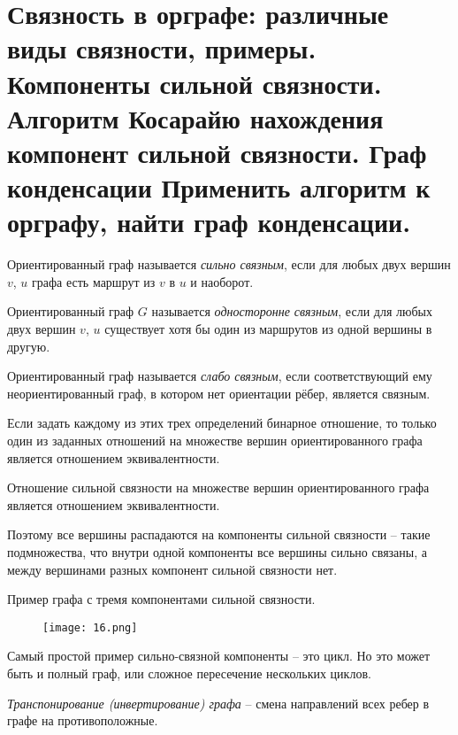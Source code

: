 \section{Связность в орграфе: различные виды связности, примеры. Компоненты сильной связности. 
Алгоритм Косарайю нахождения компонент сильной связности. Граф конденсации Применить 
алгоритм к орграфу, найти граф конденсации.}

\begin{definition}
    Ориентированный граф называется \textit{сильно связным}, если для
    любых двух вершин $v$, $u$ графа есть маршрут из $v$ в $u$ и наоборот.
\end{definition}

\begin{definition}
    Ориентированный граф $G$ называется \textit{односторонне связным},
    если для любых двух вершин $v$, $u$ существует хотя бы один из маршрутов из
    одной вершины в другую.
\end{definition}

\begin{definition}
    Ориентированный граф называется \textit{слабо связным}, если
    соответствующий ему неориентированный граф, в котором нет ориентации
    рёбер, является связным.
\end{definition}

Если задать каждому из этих трех определений бинарное отношение, то
только один из заданных отношений на множестве вершин ориентированного
графа является отношением эквивалентности.

\begin{theorem}
    Отношение сильной связности на множестве вершин ориентированного
    графа является отношением эквивалентности.
\end{theorem}

Поэтому все вершины распадаются на компоненты сильной связности --
такие подмножества, что внутри одной компоненты все вершины сильно
связаны, а между вершинами разных компонент сильной связности нет.

Пример графа с тремя компонентами сильной связности.
\begin{figure}[h]
    \centering
    \texttt{[image: 16.png]}
\end{figure}

Самый простой пример сильно-связной компоненты -- это цикл. Но это может
быть и полный граф, или сложное пересечение нескольких циклов.

\begin{definition}
    \textit{Транспонирование (инвертирование) графа} -- смена
    направлений всех ребер в графе на противоположные.
\end{definition}

